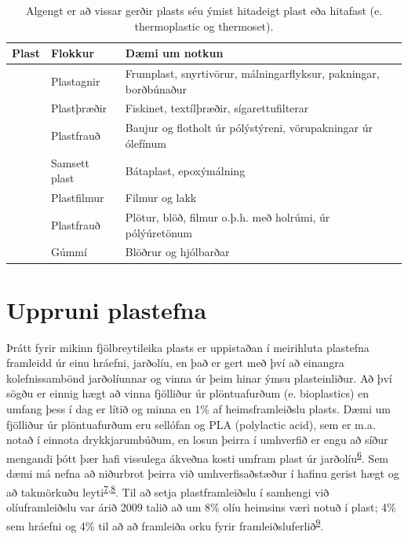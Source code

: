\documentclass[icelandic,]{book}
\begin{document}
\begin{table}[t]

\caption{\label{tab:plast}Algengt er að vissar gerðir plasts séu ýmist hitadeigt plast eða hitafast (e. thermoplastic og thermoset).}
\centering
\begin{tabular}{lp{1.6cm}p{4.8cm}}
\toprule
Plast & Flokkur & Dæmi um notkun\\
\midrule
&  Plastagnir & Frumplast, snyrtivörur, málningarflyksur, pakningar, borðbúnaður\\
& Plastþræðir & Fiskinet, textílþræðir, sígarettufilterar\\
 &  Plastfrauð & Baujur og flotholt úr pólýstýreni, vörupakningar úr ólefínum\\
\addlinespace
\hline
\addlinespace
& Samsett plast & Bátaplast, epoxýmálning\\
&  Plastfilmur & Filmur og lakk\\
& Plastfrauð & Plötur, blöð, filmur o.þ.h. með holrúmi, úr pólýúretönum\\
 &  Gúmmí & Blöðrur og hjólbarðar\\
\bottomrule
\end{tabular}
\end{table}




\hypertarget{uppruni-plastefna}{%
\section*{Uppruni plastefna}\label{uppruni-plastefna}}

Þrátt fyrir mikinn fjölbreytileika plasts er uppistaðan í meirihluta plastefna framleidd úr einu hráefni, jarðolíu, en það er gert með því að einangra kolefnissambönd jarðolíunnar og vinna úr þeim hinar ýmsu plasteinliður. Að því sögðu er einnig hægt að vinna fjölliður úr plöntuafurðum (e. bioplastics) en umfang þess í dag er lítið og minna en 1\% af heimsframleiðslu plasts. Dæmi um fjölliður úr plöntuafurðum eru sellófan og PLA (polylactic acid), sem er m.a. notað í einnota drykkjarumbúðum, en losun þeirra í umhverfið er engu að síður mengandi þótt þær hafi vissulega ákveðna kosti umfram plast úr jarðolíu\textsuperscript{\protect\hyperlink{ref-karamanlioglu2017abiotic}{6}}. Sem dæmi má nefna að niðurbrot þeirra við umhverfisaðstæður í hafinu gerist hægt og að takmörkuðu leyti\textsuperscript{\protect\hyperlink{ref-tsuji2002environmental-1}{7},\protect\hyperlink{ref-tsuji2002environmental-2}{8}}. Til að setja plastframleiðslu í samhengi við olíuframleiðslu var árið 2009 talið að um 8\% olíu heimsins væri notuð í plast; 4\% sem hráefni og 4\% til að að framleiða orku fyrir framleiðsluferlið\textsuperscript{\protect\hyperlink{ref-hopewell2009plastics}{9}}.
\end{document}
